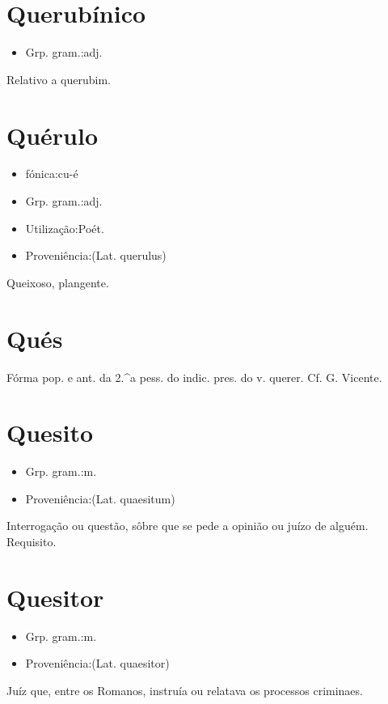 \section{Querubínico}
\begin{itemize}
\item {Grp. gram.:adj.}
\end{itemize}
Relativo a querubim.
\section{Quérulo}
\begin{itemize}
\item {fónica:cu-é}
\end{itemize}
\begin{itemize}
\item {Grp. gram.:adj.}
\end{itemize}
\begin{itemize}
\item {Utilização:Poét.}
\end{itemize}
\begin{itemize}
\item {Proveniência:(Lat. \textunderscore querulus\textunderscore )}
\end{itemize}
Queixoso, plangente.
\section{Qués}
Fórma pop. e ant. da 2.^a pess. do indic. pres. do v. \textunderscore querer\textunderscore . Cf. G. Vicente.
\section{Quesito}
\begin{itemize}
\item {Grp. gram.:m.}
\end{itemize}
\begin{itemize}
\item {Proveniência:(Lat. \textunderscore quaesitum\textunderscore )}
\end{itemize}
Interrogação ou questão, sôbre que se pede a opinião ou juízo de alguém.
Requisito.
\section{Quesitor}
\begin{itemize}
\item {Grp. gram.:m.}
\end{itemize}
\begin{itemize}
\item {Proveniência:(Lat. \textunderscore quaesitor\textunderscore )}
\end{itemize}
Juíz que, entre os Romanos, instruía ou relatava os processos criminaes.
